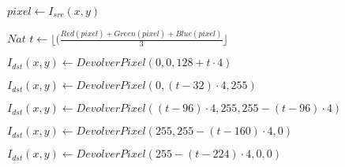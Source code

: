 \begin{algorithm}[H]
  \begin{algorithmic}[1]

			  
				\STATE $ pixel \gets I_{src}(x,y)$
				
				\STATE $Nat $ $ t \gets \lfloor(\frac{Red(pixel)+Green(pixel)+Blue(pixel)}{3}\rfloor$
				
					
					\STATE $I_{dst}(x,y) \gets DevolverPixel(0,0,128+t \cdot 4)$
				
					
					\STATE $I_{dst}(x,y) \gets DevolverPixel(0,(t-32) \cdot 4,255)$

				
					\STATE $I_{dst}(x,y) \gets DevolverPixel((t-96) \cdot 4,255, 255-(t-96) \cdot 4)$

				
					\STATE $I_{dst}(x,y) \gets DevolverPixel(255, 255-(t-160) \cdot 4, 0)$

				\ELSE
				
					\STATE $I_{dst}(x,y) \gets DevolverPixel(255-(t-224) \cdot 4, 0, 0)$

				\ENDIF
			
			\ENDFOR

		 \ENDFOR

  \end{algorithmic}
  \caption{$temperature (I_{src}, I_{dst})$}
  \label{alg:temperature}
\end{algorithm}	
